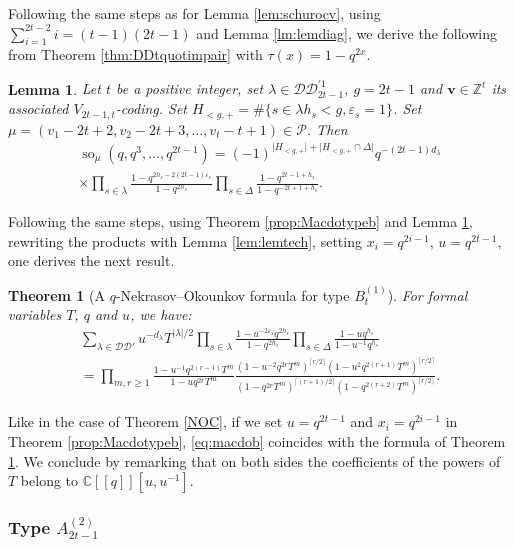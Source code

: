 \documentclass[11pt,letterpaper]{amsart}
\def\bbbz{\mathbb Z}
\def\ccdd{\mathcal {DD}}
\def\ccp{\mathcal P}
\newtheorem{thm}[df]{Theorem}
\newtheorem{lm}[df]{Lemma}
\DeclareMathOperator{\oo}{so}
\numberwithin{equation}{section}
\numberwithin{df}{section}
\begin{document}
Following the same steps as for Lemma \ref{lem:schurocv}, using $\sum_{i=1}^{2t-2}i=(t-1)(2t-1)$ and Lemma \ref{lm:lemdiag}, we derive the following from Theorem \ref{thm:DDtquotimpair} with $\tau(x)=1-q^{2x}$.
\begin{lm}\label{lem:schurob}
Let $t$ be a positive integer, set $\lambda\in\ccdd_{2t-1}^{'1}$, $g=2t-1$ and $\mathbf{v}\in\bbbz^t$ its associated $V_{2t-1,t}$-coding. Set $H_{<g,+}=\#\lbrace s\in\lambda h_s<g, \varepsilon_s=1\rbrace$.
 Set $\mu=(v_1-2t+2,v_2-2t+3,\dots,v_t-t+1)\in\ccp$. Then
 \begin{multline*}\label{eq:schursob}
\oo_{\mu}(q,q^3,\dots,q^{2t-1})=(-1)^{\lvert H_{<g,+}\rvert+\lvert H_{<g,+}\cap \Delta\rvert} q^{-(2t-1)d_\lambda}\\\times\prod_{s\in\lambda}\frac{1-q^{2h_s-2(2t-1)\varepsilon_s}}{1-q^{2h_s}}\prod_{s\in\Delta}\frac{1-q^{2t-1+h_s}}{1-q^{-2t+1+h_s}}.
 \end{multline*}
 \end{lm}


Following the same steps, using Theorem \ref{prop:Macdotypeb} and Lemma \ref{lem:schurob}, rewriting the products with Lemma \ref{lem:lemtech}, setting $x_i=q^{2i-1}$, $u=q^{2t-1}$, one derives the next result.
\begin{thm}[A $q$-Nekrasov--Okounkov formula for type $B^{(1)}_{t}$]\label{NOB}
For formal variables $T$, $q$ and $u$, we have:
\begin{multline*}
\sum_{\lambda\in\ccdd'} u^{-d_\lambda}T^{\lvert \lambda\rvert/2}\prod_{s\in\lambda}\frac{1-u^{-2\varepsilon_s}q^{2h_s}}{1-q^{2h_s}}\prod_{s\in\Delta}\frac{1-uq^{h_s}}{1-u^{-1}q^{h_s}}\\=
\prod_{m,r\geq 1}\frac{1-u^{-1}q^{2(r-1)}T^{m}}{1-uq^{2r}T^{m}}\frac{\left(1-u^{-2}q^{2r}T^m\right)^{\lceil r/2 \rceil}\left(1-u^2q^{2(r+1)}T^m\right)^{\lceil r/2 \rceil}}{\left(1-q^{2r}T^m\right)^{\lceil (r+1)/2 \rceil}\left(1-q^{2(r+2)}T^m\right)^{\lceil r/2 \rceil}}.
\end{multline*}
\end{thm}

Like in the case of Theorem \ref{NOC}, if we set $u=q^{2t-1}$ and $x_i=q^{2i-1}$ in Theorem \ref{prop:Macdotypeb}, \eqref{eq:macdob} coincides with the formula of Theorem \ref{NOB}. We conclude by remarking that on both sides the coefficients of the powers of $T$ belong to $\mathbb{C}[[q]][u,u^{-1}]$.


\subsubsection{Type $A^{(2)}_{2t-1}$}
%
\end{document}
